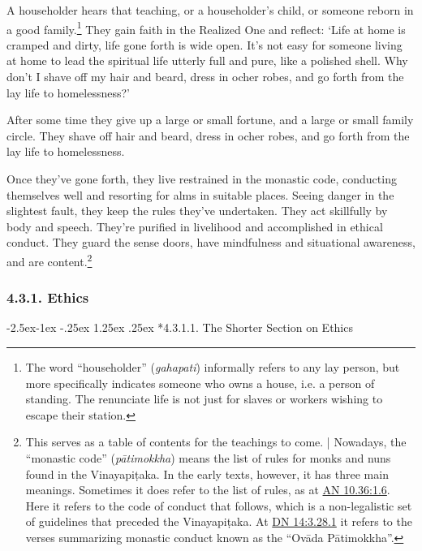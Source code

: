 \documentclass[12pt,openany]{book}%
\makeatletter
\renewcommand\paragraph{\@startsection{paragraph}{4}{\z@}%
            {-2.5ex\@plus -1ex \@minus -.25ex}%
            {1.25ex \@plus .25ex}%
            {\noindent\normalfont\itshape\small}}
\makeatother
\begin{document}
A householder hears that teaching, or a householder’s child, or someone reborn in a good family.\footnote{The word “householder” (\textit{gahapati}) informally refers to any lay person, but more specifically indicates someone who owns a house, i.e. a person of standing. The renunciate life is not just for slaves or workers wishing to escape their station. } They gain faith in the Realized One and reflect: ‘Life at home is cramped and dirty, life gone forth is wide open. It’s not easy for someone living at home to lead the spiritual life utterly full and pure, like a polished shell. Why don’t I shave off my hair and beard, dress in ocher robes, and go forth from the lay life to homelessness?’ 

After some time they give up a large or small fortune, and a large or small family circle. They shave off hair and beard, dress in ocher robes, and go forth from the lay life to homelessness. 

Once they’ve gone forth, they live restrained in the monastic code, conducting themselves well and resorting for alms in suitable places. Seeing danger in the slightest fault, they keep the rules they’ve undertaken. They act skillfully by body and speech. They’re purified in livelihood and accomplished in ethical conduct. They guard the sense doors, have mindfulness and situational awareness, and are content.\footnote{This serves as a table of contents for the teachings to come. | Nowadays, the “monastic code” (\textit{\textsanskrit{pātimokkha}}) means the list of rules for monks and nuns found in the \textsanskrit{Vinayapiṭaka}. In the early texts, however, it has three main meanings. Sometimes it does refer to the list of rules, as at \href{https://suttacentral.net/an10.36/en/sujato\#1.6}{AN 10.36:1.6}. Here it refers to the code of conduct that follows, which is a non-legalistic set of guidelines that preceded the \textsanskrit{Vinayapiṭaka}. At \href{https://suttacentral.net/dn14/en/sujato\#3.28.1}{DN 14:3.28.1} it refers to the verses summarizing monastic conduct known as the “\textsanskrit{Ovāda} \textsanskrit{Pātimokkha}”. } 

\subsubsection*{4.3.1. Ethics }

\paragraph*{4.3.1.1. The Shorter Section on Ethics }
\end{document}
